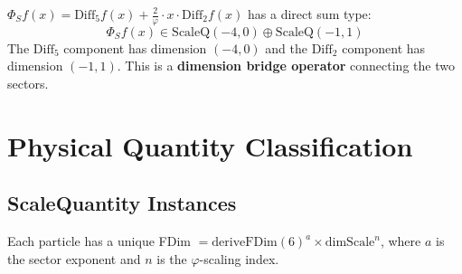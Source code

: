 \begin{definition}
\label{def:dim_d5half}
$\Phi_S f(x) = \mathrm{Diff}_5 f(x) + \frac{2}{\varphi} \cdot x \cdot \mathrm{Diff}_2 f(x)$ has a direct sum type:
\[
\Phi_S f(x) \in \mathrm{ScaleQ}(-4, 0) \oplus \mathrm{ScaleQ}(-1, 1)
\]
The $\mathrm{Diff}_5$ component has dimension $(-4, 0)$ and the $\mathrm{Diff}_2$ component has dimension $(-1, 1)$.
This is a \textbf{dimension bridge operator} connecting the two sectors.
\end{definition}

\section{Physical Quantity Classification}
\label{sec:dim_classification}

\subsection{ScaleQuantity Instances}

Each particle has a unique FDim $= \mathrm{deriveFDim}(6)^a \times \mathrm{dimScale}^n$, where
$a$ is the sector exponent and $n$ is the $\varphi$-scaling index.

